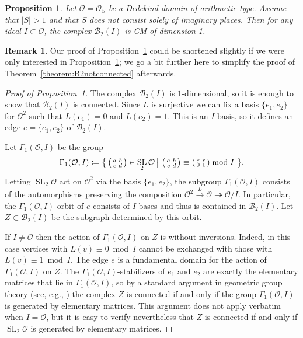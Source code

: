 \documentclass[11 pt]{article}
\theoremstyle{plain}
\newtheorem{proposition}[theorem]{Proposition}
\theoremstyle{definition}
\newtheorem{remark}[theorem]{Remark}
\numberwithin{equation}{section}
\DeclareMathOperator{\SL}{SL}
\newcommand\F{\ensuremath{\mathbb{F}}}
\renewcommand{\O}{\mathcal{O}}
\newcommand\PartialBases{\ensuremath{\mathcal{B}}}
\newcommand{\PB}{\PartialBases}
\newcommand\onto{\twoheadrightarrow}
\newcommand\coloneq{\mathrel{\mathop:}\mkern-1.2mu=}
\newcommand\abs[1]{\left\lvert#1\right\rvert}
\newcommand{\change}{}
\begin{document}
\begin{proposition}
\label{prop:basecasen2}
Let $\O=\O_S$ be a Dedekind domain of arithmetic type. Assume that $\abs{S}>1$ and that $S$ does not consist solely of imaginary places. Then for any ideal $I\subset \O$, the complex $\PB_2(I)$ is CM of dimension 1.
\end{proposition}
\begin{remark}
Our proof of Proposition~\ref{prop:basecasen2} could be shortened slightly if we were only interested in Proposition~\ref{prop:basecasen2}; we go a bit further here to simplify the proof of Theorem~\ref{theorem:B2notconnected} afterwards.
\end{remark}
\change
\begin{proof}[Proof of Proposition~\ref{prop:basecasen2}]
The complex $\PB_2(I)$ is $1$-dimensional, so it is enough to show that $\PB_2(I)$ is connected.
Since $L$ is surjective we can fix a basis $\{e_1,e_2\}$ for $\O^2$ such
that $L(e_1)=0$ and $L(e_2) = 1$. 
This is an $I$-basis, so it defines an edge $e = \{e_1,e_2\}$
of $\PartialBases_2(I)$.

Let $\Gamma_1(\O,I)$ be the group
\[\Gamma_1(\O,I) \coloneq \big\{\left(\begin{smallmatrix} a&b\\c&d \end{smallmatrix}\right) \in \SL_2 \O\,\big|\,\left(\begin{smallmatrix} a&b\\c&d \end{smallmatrix}\right) \equiv \left(\begin{smallmatrix} \ast&\ast\\0&1 \end{smallmatrix}\right)\bmod{I}\ \big\}.\]
Letting $\SL_2 \O$ act on $\O^2$ via the basis
$\{e_1,e_2\}$, the subgroup $\Gamma_1(\O,I)$ consists of the automorphisms preserving the composition $\O^2\overset{L}{\to}\O\onto \O/I$. \change %
 In particular, the $\Gamma_1(\O,I)$-orbit of $e$ consists of $I$-bases and thus is contained in $\PartialBases_2(I)$.  Let $Z\subset \PB_2(I)$ be the subgraph determined by this orbit.

If $I\neq \O$ then the action of $\Gamma_1(\O,I)$ on $Z$ is without inversions.  Indeed,
in this case vertices with $L(v)\equiv 0\bmod{I}$ cannot be exchanged with those with $L(v)\equiv 1\bmod{I}$.  
The edge $e$ is a fundamental domain for the action of $\Gamma_1(\O,I)$ on $Z$.  The $\Gamma_1(\O,I)$-stabilizers
of $e_1$ and $e_2$ are exactly the elementary matrices that lie
in $\Gamma_1(\O,I)$, so by a standard argument in geometric group theory
(see, e.g., \cite[Lemma I.4.1.2]{SerreTrees}) the complex $Z$ is connected if and only if the group $\Gamma_1(\O,I)$
is generated by elementary matrices. This argument does not apply verbatim when $I=\O$,
but it is easy to verify nevertheless that $Z$ is connected if and only if $\SL_2\O$ is generated by elementary matrices.


\end{proof}
\end{document}
